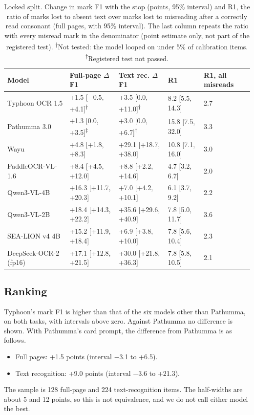 \begin{table}[t]
\caption{Locked split. Change in mark F1 with the stop (points, 95\% interval) and R1, the ratio of marks lost to absent text over marks lost to misreading after a correctly read consonant (full pages, with 95\% interval). The last column repeats the ratio with every misread mark in the denominator (point estimate only, not part of the registered test). \textsuperscript{$\dagger$}Not tested: the model looped on under 5\% of calibration items. \textsuperscript{$\ddagger$}Registered test not passed.}\label{tab:locked}
\centering\footnotesize
\begin{tabular}{@{}l llll@{}}
\toprule
Model & Full-page $\Delta$F1 & Text rec. $\Delta$F1 & R1 & R1, all misreads\\
\midrule
Typhoon OCR 1.5 & +1.5 [$-$0.5, +4.1]\textsuperscript{$\dagger$} & +3.5 [0.0, +11.0]\textsuperscript{$\dagger$} & 8.2 [5.5, 14.3] & 2.7\\
Pathumma 3.0 & +1.3 [0.0, +3.5]\textsuperscript{$\ddagger$} & +3.0 [0.0, +6.7]\textsuperscript{$\dagger$} & 15.8 [7.5, 32.0] & 3.3\\
Wayu & +4.8 [+1.8, +8.3] & +29.1 [+18.7, +38.0] & 10.8 [7.1, 16.0] & 3.0\\
PaddleOCR-VL-1.6 & +8.4 [+4.5, +12.0] & +8.8 [+2.2, +14.6] & 4.7 [3.2, 6.7] & 2.0\\
Qwen3-VL-4B & +16.3 [+11.7, +20.3] & +7.0 [+4.2, +10.1] & 6.1 [3.7, 9.2] & 2.2\\
Qwen3-VL-2B & +18.4 [+14.3, +22.2] & +35.6 [+29.6, +40.9] & 7.8 [5.0, 11.7] & 3.6\\
SEA-LION v4 4B & +15.2 [+11.9, +18.4] & +6.9 [+3.8, +10.0] & 7.8 [5.6, 10.4] & 2.3\\
DeepSeek-OCR-2 (fp16) & +17.1 [+12.8, +21.5] & +30.0 [+21.8, +36.3] & 7.8 [5.8, 10.5] & 2.1\\
\bottomrule
\end{tabular}
\end{table}

\subsection{Ranking}
Typhoon's mark F1 is higher than that of the six models other than Pathumma, on both tasks, with intervals above zero. Against Pathumma no difference is shown. With Pathumma's card prompt, the difference from Pathumma is as follows.
\begin{itemize}
\item Full pages: +1.5 points (interval $-$3.1 to +6.5).
\item Text recognition: +9.0 points (interval $-$3.6 to +21.3).
\end{itemize}
The sample is 128 full-page and 224 text-recognition items. The half-widths are about 5 and 12 points, so this is not equivalence, and we do not call either model the best.

